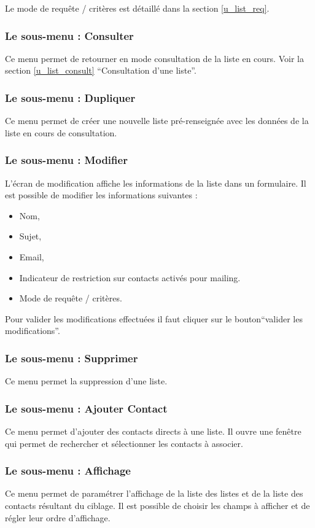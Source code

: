 Le mode de requête / critères est détaillé dans la section \ref{u_list_req}.


\subsubsection{Le sous-menu : Consulter}

Ce menu permet de retourner en mode consultation de la liste en cours.
Voir la section \ref{u_list_consult} ``Consultation d'une liste''.


\subsubsection{Le sous-menu : Dupliquer}

Ce menu permet de créer une nouvelle liste pré-renseignée avec les données de la liste en cours de consultation.


\subsubsection{Le sous-menu : Modifier}

L'écran de modification affiche les informations de la liste dans un formulaire.
Il est possible de modifier les informations suivantes :

\begin{itemize}
\item Nom,
\item Sujet,
\item Email,
\item Indicateur de restriction sur contacts activés pour mailing.
\item Mode de requête / critères.
\end{itemize}

Pour valider les modifications effectuées il faut cliquer sur le bouton``valider les modifications''.


\subsubsection{Le sous-menu : Supprimer}
Ce menu permet la suppression d'une liste.


\subsubsection{Le sous-menu : Ajouter Contact}

Ce menu permet d'ajouter des contacts directs à une liste.
Il ouvre une fenêtre qui permet de rechercher et sélectionner les contacts à associer.


\subsubsection{Le sous-menu : Affichage}

Ce menu permet de paramétrer l'affichage de la liste des listes et de la liste des contacts résultant du ciblage. Il est possible de choisir les champs à afficher et de régler leur ordre d'affichage.
